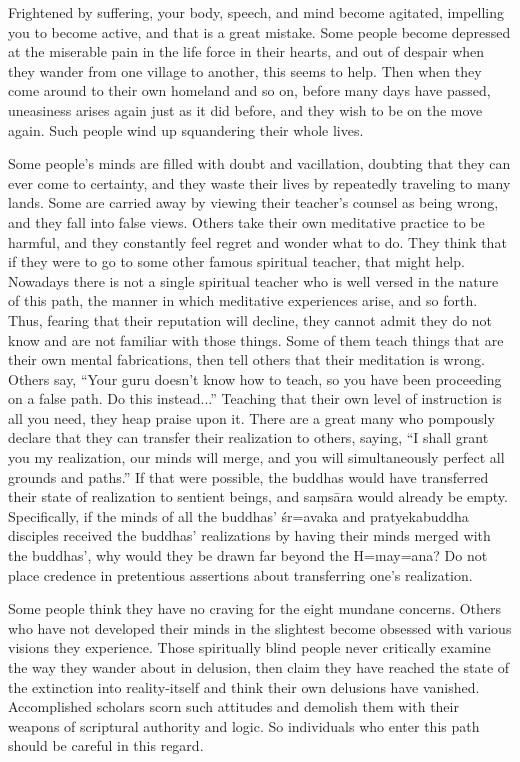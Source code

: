 \documentclass[11pt,twocolumn]{article}
\begin{document}
Frightened by suffering, your body, speech, and mind become agitated,
impelling you to become active, and that is a great mistake. Some
people become depressed at the miserable pain in the life force in
their hearts, and out of despair when they wander from one village to
another, this seems to help. Then when they come around to their own
homeland and so on, before many days have passed, uneasiness arises
again just as it did before, and they wish to be on the move
again. Such people wind up squandering their whole lives.

Some people's minds are filled with doubt and vacillation, doubting
that they can ever come to certainty, and they waste their lives by
repeatedly traveling to many lands. Some are carried away by viewing
their teacher's counsel as being wrong, and they fall into false
views. Others take their own meditative practice to be harmful, and
they constantly feel regret and wonder what to do. They think that if
they were to go to some other famous spiritual teacher, that might
help. Nowadays there is not a single spiritual teacher who is well
versed in the nature of this path, the manner in which meditative
experiences arise, and so forth. Thus, fearing that their reputation
will decline, they cannot admit they do not know and are not familiar
with those things. Some of them teach things that are their own mental
fabrications, then tell others that their meditation is wrong. Others
say, ``Your guru doesn't know how to teach, so you have been
proceeding on a false path. Do this instead...'' Teaching that their
own level of instruction is all you need, they heap praise upon
it. There are a great many who pompously declare that they can
transfer their realization to others, saying, ``I shall grant you my
realization, our minds will merge, and you will simultaneously perfect
all grounds and paths.'' If that were possible, the buddhas would have
transferred their state of realization to sentient beings, and
sa\d{m}s\={a}ra would already be empty. Specifically, if the minds of
all the buddhas' \'sr\a={a}vaka and pratyekabuddha disciples received
the buddhas' realizations by having their minds merged with the
buddhas', why would they be drawn far beyond the H\a={\i}nay\a={a}na?
Do not place credence in pretentious assertions about transferring
one's realization.

Some people think they have no craving for the eight mundane
concerns. Others who have not developed their minds in the slightest
become obsessed with various visions they experience. Those
spiritually blind people never critically examine the way they wander
about in delusion, then claim they have reached the state of the
extinction into reality\hyp{}itself and think their own delusions have
vanished. Accomplished scholars scorn such attitudes and demolish them
with their weapons of scriptural authority and logic. So individuals
who enter this path should be careful in this regard.
\end{document}
